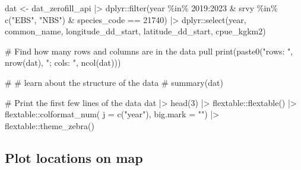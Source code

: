 \documentclass[
  letterpaper,
  oneside,
  open=any]{scrbook}
\newenvironment{Shaded}{\begin{snugshade}}{\end{snugshade}}
\newcommand{\AttributeTok}[1]{\textcolor[rgb]{0.40,0.45,0.13}{#1}}
\newcommand{\CommentTok}[1]{\textcolor[rgb]{0.37,0.37,0.37}{#1}}
\newcommand{\DecValTok}[1]{\textcolor[rgb]{0.68,0.00,0.00}{#1}}
\newcommand{\FunctionTok}[1]{\textcolor[rgb]{0.28,0.35,0.67}{#1}}
\newcommand{\NormalTok}[1]{\textcolor[rgb]{0.00,0.23,0.31}{#1}}
\newcommand{\OtherTok}[1]{\textcolor[rgb]{0.00,0.23,0.31}{#1}}
\newcommand{\SpecialCharTok}[1]{\textcolor[rgb]{0.37,0.37,0.37}{#1}}
\newcommand{\StringTok}[1]{\textcolor[rgb]{0.13,0.47,0.30}{#1}}
\begin{document}
\begin{Shaded}
\begin{Highlighting}[]
\NormalTok{dat }\OtherTok{\textless{}{-}}\NormalTok{ dat\_zerofill\_api }\SpecialCharTok{|\textgreater{}} 
\NormalTok{  dplyr}\SpecialCharTok{::}\FunctionTok{filter}\NormalTok{(year }\SpecialCharTok{\%in\%} \DecValTok{2019}\SpecialCharTok{:}\DecValTok{2023} \SpecialCharTok{\&} 
\NormalTok{                  srvy }\SpecialCharTok{\%in\%} \FunctionTok{c}\NormalTok{(}\StringTok{"EBS"}\NormalTok{, }\StringTok{"NBS"}\NormalTok{) }\SpecialCharTok{\&} 
\NormalTok{                  species\_code }\SpecialCharTok{==} \DecValTok{21740}\NormalTok{) }\SpecialCharTok{|\textgreater{}} 
\NormalTok{  dplyr}\SpecialCharTok{::}\FunctionTok{select}\NormalTok{(year, common\_name, longitude\_dd\_start, latitude\_dd\_start, cpue\_kgkm2)}

\CommentTok{\# Find how many rows and columns are in the data pull}
\FunctionTok{print}\NormalTok{(}\FunctionTok{paste0}\NormalTok{(}\StringTok{"rows: "}\NormalTok{, }\FunctionTok{nrow}\NormalTok{(dat), }\StringTok{"; cols: "}\NormalTok{, }\FunctionTok{ncol}\NormalTok{(dat)))}

\CommentTok{\# \# learn about the structure of the data}
\CommentTok{\# summary(dat)}

\CommentTok{\# Print the first few lines of the data }
\NormalTok{dat }\SpecialCharTok{|\textgreater{}} 
  \FunctionTok{head}\NormalTok{(}\DecValTok{3}\NormalTok{) }\SpecialCharTok{|\textgreater{}} 
\NormalTok{  flextable}\SpecialCharTok{::}\FunctionTok{flextable}\NormalTok{() }\SpecialCharTok{|\textgreater{}}
\NormalTok{  flextable}\SpecialCharTok{::}\FunctionTok{colformat\_num}\NormalTok{(}
      \AttributeTok{j =} \FunctionTok{c}\NormalTok{(}\StringTok{"year"}\NormalTok{), }
      \AttributeTok{big.mark =} \StringTok{""}\NormalTok{) }\SpecialCharTok{|\textgreater{}} 
\NormalTok{  flextable}\SpecialCharTok{::}\FunctionTok{theme\_zebra}\NormalTok{()}
\end{Highlighting}
\end{Shaded}

\subsection{Plot locations on map}\label{plot-locations-on-map}
\end{document}
